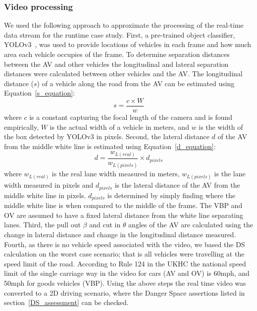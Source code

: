 \subsubsection{Video processing}
%
We used the following approach to approximate the processing of the real-time data stream for the runtime case study. 
%
First, a pre-trained object classifier, YOLOv3~\cite{Yolo}, was used to provide locations of vehicles in each frame and how much area each vehicle occupies of the frame. 
%
To determine separation distances between the AV and other vehicles %
the longitudinal and lateral separation distances were calculated between other vehicles and the AV.
%
The longitudinal distance ($s$) of a vehicle along the road from the AV can be estimated using Equation~\ref{s_equation}:
\begin{equation}\label{s_equation}
    s = \frac{c\times W}{w}
\end{equation}
where $c$ is a constant capturing the focal length of the camera and is found empirically, $W$ is the actual width of a vehicle in meters, and $w$ is the width of the box detected by YOLOv3 in pixels. 
%
Second, the lateral distance $d$ of the AV from the middle white line is estimated using Equation~\ref{d_equation}: 
%
\begin{equation}\label{d_equation}
    d = \frac{w_{L (real)}}{w_{L (pixels)}} \times d_{pixels}
\end{equation}
%
where $w_{L (real)}$ is the real lane width measured in meters, $w_{L (pixels)}$ is the lane width measured in pixels and $d_{pixels}$ is the lateral distance of the AV from the middle white line in pixels. $d_{pixels}$ is determined by simply finding where the middle white line is when compared to the middle of the frame. The VBP and OV are assumed to have a fixed lateral distance from the white line separating lanes. 
%
Third, the pull out $\beta$ and cut in $\theta$ angles of the AV are calculated using the change in lateral distance and change in the longitudinal distance measured. Fourth, as there is no vehicle speed associated with the video, we based the DS calculation on the worst case scenario; that is all vehicles were travelling at the speed limit of the road. 
%
According to Rule 124 in the UKHC the national speed limit of the single carriage way in the video for cars (AV and OV) is 60mph, and 50mph for goods vehicles (VBP). Using the above steps the real time video was converted to a 2D driving scenario, where the Danger Space assertions listed in section~\ref{DS_assessment} can be checked.

